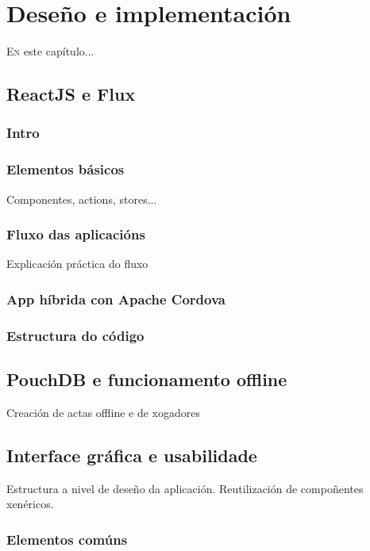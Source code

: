 \chapter{Deseño e implementación}
\minitoc


  \lettrine{E}{n} este capítulo...

  \section{ReactJS e Flux}
    \subsection{Intro}
    \subsection{Elementos básicos}
    Componentes, actions, stores...
    \subsection{Fluxo das aplicacións}
    Explicación práctica do fluxo
    \subsection{App híbrida con Apache Cordova}

    \subsection{Estructura do código}

  \section{PouchDB e funcionamento offline}
  Creación de actas offline e de xogadores

  \section{Interface gráfica e usabilidade}
  Estructura a nivel de deseño da aplicación. Reutilización de compoñentes xenéricos.

    \subsection{Elementos comúns}

